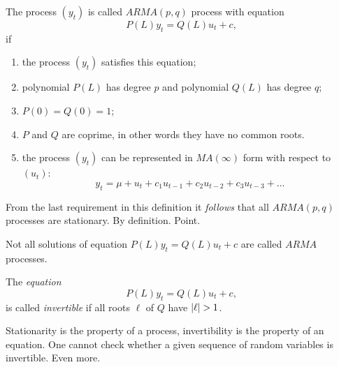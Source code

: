 \documentclass[12pt]{article} %
\begin{document}
\begin{definition}
    The process $(y_t)$ is called $ARMA(p, q)$ process with equation  
    \[
    P(L) y_t = Q(L) u_t + c,    
    \]
    if 
    \begin{enumerate}
        \item the process $(y_t)$ satisfies this equation;
        \item polynomial $P(L)$ has degree $p$ and polynomial $Q(L)$ has degree $q$;
        \item $P(0) = Q(0) = 1$;
        \item $P$ and $Q$ are coprime, in other words they have no common roots. 
        \item the process $(y_t)$ can be represented in $MA(\infty)$ form with respect to $(u_t)$:
        \[
            y_t = \mu + u_t + c_1 u_{t-1} + c_2 u_{t-2} + c_3 u_{t-3} + \ldots
        \]
    \end{enumerate}
\end{definition}


From the last requirement in this definition it \textit{follows} that all $ARMA(p,q)$ processes are 
stationary. By definition. Point. 

Not all solutions of equation $P(L) y_t = Q(L) u_t + c$ are called $ARMA$ processes. 



\begin{definition}
    The \textit{equation}
    \[
    P(L) y_t = Q(L) u_t + c,    
    \]
    is called \textit{invertible} if all roots $\ell$ of $Q$ have $\abs{\ell} > 1$.
\end{definition}

Stationarity is the property of a process, invertibility is the property of an equation. 
One cannot check whether a given sequence of random variables is invertible. 
Even more. 
\end{document}
